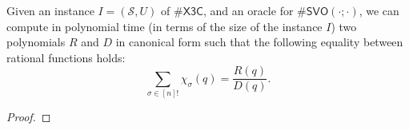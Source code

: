 \documentclass[10pt,a4paper]{amsart}
\begin{document}
\begin{proposition}\label{prop:compute-polynomials}
   Given an instance $I = (\mathcal{S}, U)$ of $\#\mathsf{X3C}$, and an oracle for $\#\mathsf{SVO}(\cdot;\cdot)$, we can compute in polynomial time (in terms of the size of the instance $I$) two polynomials $R$ and $D$ in canonical form such that the following equality between rational functions holds:
   \[ \sum_{\sigma \in [n]!} \chi_{\sigma}(q) = \frac{R(q)}{D(q)}.
    \]
\end{proposition}

\begin{proof}


\end{proof}
\end{document}

